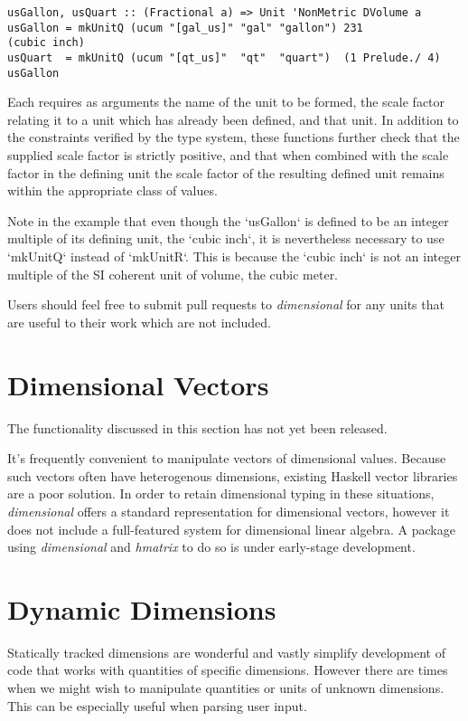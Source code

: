 \documentclass[11pt]{report}
\newcommand{\packagename}[1]{\textit{#1}}
\newcommand{\thispackage}{\packagename{dimensional}}
\newcommand{\prerelease}{\begin{framed}
The functionality discussed in this section has not yet been released.
\end{framed}}
\begin{document}
\begin{lstlisting}
usGallon, usQuart :: (Fractional a) => Unit 'NonMetric DVolume a
usGallon = mkUnitQ (ucum "[gal_us]" "gal" "gallon") 231             (cubic inch)
usQuart  = mkUnitQ (ucum "[qt_us]"  "qt"  "quart")  (1 Prelude./ 4) usGallon
\end{lstlisting}

Each requires as arguments the name of the unit to be formed, the scale factor relating it to a unit which has already been defined,
and that unit. In addition to the constraints verified by the type system, these functions further check that the supplied scale factor is
strictly positive, and that when combined with the scale factor in the defining unit the scale factor of the resulting defined unit remains
within the appropriate class of values.

Note in the example that even though the `usGallon` is defined to be an integer multiple of its defining unit, the `cubic inch`, it is nevertheless
necessary to use `mkUnitQ` instead of `mkUnitR`. This is because the `cubic inch` is not an integer multiple of the SI coherent unit of volume, the cubic meter.

Users should feel free to submit pull requests to \thispackage{} for any units that are useful to their work which are not included.




\chapter{Dimensional Vectors}

\prerelease{}

It's frequently convenient to manipulate vectors of dimensional values. Because such vectors often have heterogenous
dimensions, existing Haskell vector libraries are a poor solution. In order to retain dimensional typing in these situations,
\thispackage{} offers a standard representation for dimensional vectors, however it does not include a full-featured system for
dimensional linear algebra. A package using \thispackage{} and \packagename{hmatrix} to do so is under early-stage development.





\chapter{Dynamic Dimensions}

Statically tracked dimensions are wonderful and vastly simplify development of code that works with quantities of specific
dimensions. However there are times when we might wish to manipulate quantities or units of unknown dimensions. This can be
especially useful when parsing user input.
\end{document}

